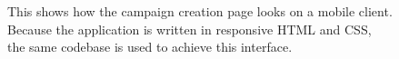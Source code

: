 \documentclass{article}
\begin{document}
		\begin{figure}[ht]
			\centering
			\caption{This shows how the campaign creation page looks on a mobile client. Because the application is written in responsive HTML and CSS, the same codebase is used to achieve this interface.}
			\label{fig:eval-mobile-1}
		\end{figure}
\end{document}
